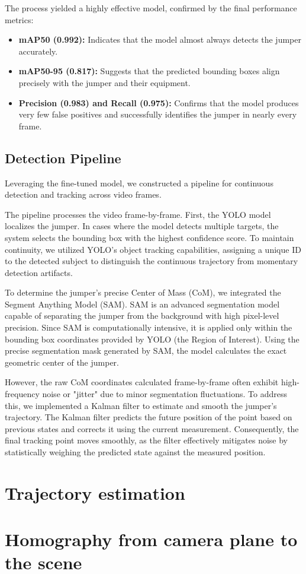 The process yielded a highly effective model, confirmed by the final performance metrics:
\begin{itemize}
    \item \textbf{mAP50 (0.992):} Indicates that the model almost always detects the jumper accurately.
    \item \textbf{mAP50-95 (0.817):} Suggests that the predicted bounding boxes align precisely with the jumper and their equipment.
    \item \textbf{Precision (0.983) and Recall (0.975):} Confirms that the model produces very few false positives and successfully identifies the jumper in nearly every frame.
\end{itemize}

\subsection{Detection Pipeline}
Leveraging the fine-tuned model, we constructed a pipeline for continuous detection and tracking across video frames.

The pipeline processes the video frame-by-frame. First, the YOLO model localizes the jumper. In cases where the model detects multiple targets, the system selects the bounding box with the highest confidence score. To maintain continuity, we utilized YOLO's object tracking capabilities, assigning a unique ID to the detected subject to distinguish the continuous trajectory from momentary detection artifacts.

To determine the jumper's precise Center of Mass (CoM), we integrated the Segment Anything Model (SAM). SAM is an advanced segmentation model capable of separating the jumper from the background with high pixel-level precision. Since SAM is computationally intensive, it is applied only within the bounding box coordinates provided by YOLO (the Region of Interest). Using the precise segmentation mask generated by SAM, the model calculates the exact geometric center of the jumper.

However, the raw CoM coordinates calculated frame-by-frame often exhibit high-frequency noise or "jitter" due to minor segmentation fluctuations. To address this, we implemented a Kalman filter to estimate and smooth the jumper's trajectory.  The Kalman filter predicts the future position of the point based on previous states and corrects it using the current measurement. Consequently, the final tracking point moves smoothly, as the filter effectively mitigates noise by statistically weighing the predicted state against the measured position.

\section{Trajectory estimation}

\section{Homography from camera plane to the scene}